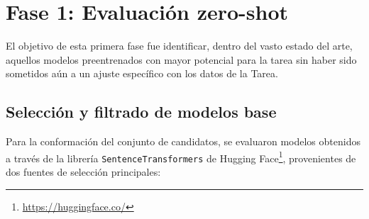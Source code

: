 \begin{table}[h!]
    \centering
    \caption{Ejemplo de pares de titulaciones relacionadas presentes en el conjunto de entrenamiento para el idioma español.}
    \label{tab:sample_training_data}
\end{table}

\section{Fase 1: Evaluación zero-shot}
\label{sec:ZeroShot}

\noindent El objetivo de esta primera fase fue identificar, dentro del vasto estado del arte, aquellos modelos preentrenados con mayor potencial para la tarea sin haber sido sometidos aún a un ajuste específico con los datos de la \gls{Tarea}.

\subsection{Selección y filtrado de modelos base}

\noindent Para la conformación del conjunto de candidatos, se evaluaron modelos obtenidos a través de la librería \texttt{SentenceTransformers} de Hugging Face\footnote{\url{https://huggingface.co/}}, provenientes de dos fuentes de selección principales:

